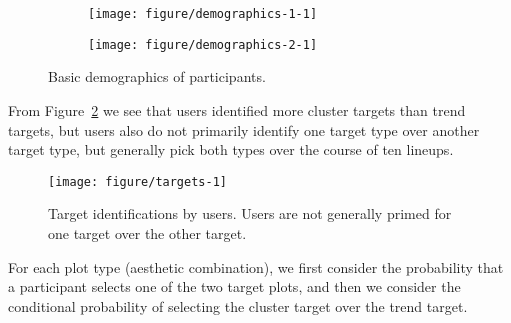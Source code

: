 \documentclass[12pt]{article}\usepackage[]{graphicx}\usepackage[]{color}
\newenvironment{knitrout}{}{} %
\begin{document}
\begin{figure}[ht]
\begin{subfigure}[t]{0.55\linewidth}
\begin{knitrout}
\color{fgcolor}

{\centering \texttt{[image: figure/demographics-1-1]} 

}



\end{knitrout}
\end{subfigure}
\begin{subfigure}[t]{0.43\linewidth}
\begin{knitrout}
\color{fgcolor}

{\centering \texttt{[image: figure/demographics-2-1]} 

}



\end{knitrout}
\end{subfigure}
\caption{\label{fig:demographics}Basic demographics of participants.}
\end{figure}


From Figure~\ref{fig:targets} we see that users identified more cluster targets than trend targets, but users also do not primarily identify one target type over another target type, but generally pick both types over the course of ten lineups.

\begin{figure}[ht]
\centering
\begin{knitrout}
\color{fgcolor}

{\centering \texttt{[image: figure/targets-1]} 

}



\end{knitrout}
\caption{\label{fig:targets}Target identifications by users. Users are not generally primed for one target over the other target.}
\end{figure}

For each plot type (aesthetic combination), we first consider the probability that a participant selects one of the two target plots, and then we consider the conditional probability of selecting the cluster target  over the trend target. 
\end{document}
